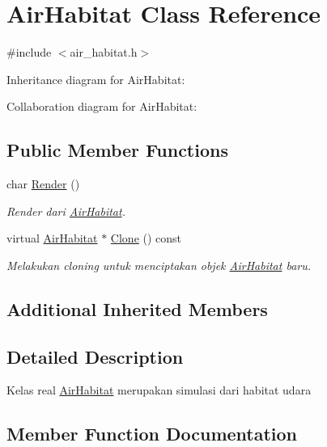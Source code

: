 \hypertarget{classAirHabitat}{}\section{Air\+Habitat Class Reference}
\label{classAirHabitat}


{\ttfamily \#include $<$air\+\_\+habitat.\+h$>$}



Inheritance diagram for Air\+Habitat\+:


Collaboration diagram for Air\+Habitat\+:
\subsection*{Public Member Functions}
\begin{DoxyCompactItemize}
\item 
char \hyperlink{classAirHabitat_a6dd1a0d8235d9687874bb229099d40ff}{Render} ()
\begin{DoxyCompactList}\small\item\em Render dari \hyperlink{classAirHabitat}{Air\+Habitat}. \end{DoxyCompactList}\item 
virtual \hyperlink{classAirHabitat}{Air\+Habitat} $\ast$ \hyperlink{classAirHabitat_a23b2fa15b4211838a9911ab7c5afac07}{Clone} () const 
\begin{DoxyCompactList}\small\item\em Melakukan cloning untuk menciptakan objek \hyperlink{classAirHabitat}{Air\+Habitat} baru. \end{DoxyCompactList}\end{DoxyCompactItemize}
\subsection*{Additional Inherited Members}


\subsection{Detailed Description}
Kelas real \hyperlink{classAirHabitat}{Air\+Habitat} merupakan simulasi dari habitat udara 

\subsection{Member Function Documentation}
